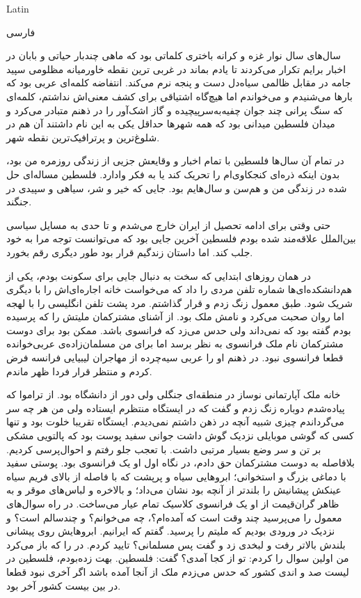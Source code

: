 \documentclass[letterpaper,12pt]{article}
\title{\ptitle}
\author{\pauthor}
\date{\today}
\begin{document}
\maketitle
\begin{latin} 
Latin 
\end{latin} 
\begin{persian} 
فارسی  
\end{persian}
سا‌ل‌های سال نوار غزه و کرانه باختری  کلماتی بود که ماهی چندبار حیاتی و بابان در اخبار برایم تکرار می‌کردند تا یادم بماند در غربی ترین نقطه خاورمیانه مظلومی سپید جامه در مقابل ظالمی سیاه‌دل دست و پنجه نرم‌ می‌کند. انتفاضه کلمه‌ای عربی بود که بارها می‌شنیدم و می‌خواندم اما هیچ‌گاه اشتیاقی برای کشف معنی‌اش نداشتم، کلمه‌ای که سنگ پرانی چند جوان چفیه‌به‌سرپیچیده و گاز اشک‌آور را در ذهنم متبادر می‌کرد و میدان فلسطین میدانی بود که همه شهر‌ها حداقل یکی به این نام داشتند آن هم در شلوغ‌ترین و پرترافیک‌ترین نقطه شهر.

در تمام آن سال‌ها فلسطین با تمام اخبار و وقایعش جزیی از زندگی روزمره من بود، بدون اینکه ذره‌ای کنجکاوی‌ام را تحریک کند یا به فکر وادارد. فلسطین مساله‌ای حل شده در زندگی من و هم‌سن و سال‌هایم بود. جایی که خیر و شر، سیاهی و سپیدی در جنگند.

حتی وقتی برای ادامه تحصیل از ایران خارج‌ می‌شدم و تا حدی به مسایل سیاسی بین‌الملل علاقه‌مند شده بودم فلسطین آخرین جایی بود که می‌توانست توجه مرا به خود جلب کند. اما داستان زندگیم قرار بود طور دیگری رقم بخورد.


در همان روزهای ابتدایی که سخت به دنبال جایی برای سکونت بودم، یکی از هم‌دانشکده‌ای‌ها شماره تلفن مردی را داد که می‌خواست خانه اجاره‌ای‌اش را با دیگری شریک شود. طبق معمول زنگ زدم و قرار گذاشتم. مرد پشت تلفن انگلیسی را با لهجه اما روان صحبت می‌کرد و نامش ملک بود. از آشنای مشترکمان ملیتش را که پرسیده بودم گفته بود که نمی‌داند ولی حدس می‌زد که فرانسوی باشد. ممکن بود برای دوست مشترکمان نام ملک فرانسوی به نظر برسد اما برای من مسلمان‌زاده‌ی عربی‌خوانده قطعا فرانسوی نبود. در ذهنم او را عربی سیه‌چرده از مهاجران لیبیایی فرانسه فرض کردم و منتظر قرار فردا ظهر ماندم.

خانه ملک آپارتمانی نوساز در منطقه‌ای جنگلی ولی دور از دانشگاه بود. از تراموا که پیاده‌شدم دوباره زنگ زدم و گفت که در ایستگاه منتظرم ایستاده ولی من هر چه سر می‌گرداندم چیزی شبیه آنچه در ذهن داشتم نمی‌دیدم. ایستگاه تقریبا خلوت بود و تنها کسی که گوشی موبایلی نزدیک گوش داشت جوانی سفید پوست بود که پالتویی مشکی بر تن و سر وضع بسیار مرتبی داشت. با تعجب جلو رفتم و احوال‌پرسی کردیم. بلافاصله به دوست مشترکمان حق دادم، در نگاه اول او یک فرانسوی بود. پوستی سفید با دماغی بزرگ و استخوانی؛ ابرو‌هایی سیاه و پرپشت که با فاصله از بالای فریم سیاه عینکش پیشانیش را بلندتر از آنچه بود نشان می‌داد؛ و بالاخره و لباس‌های موقر و به ظاهر گران‌قیمت از او یک فرانسوی کلاسیک تمام عیار‌ می‌ساخت. در راه سوال‌های معمول را می‌پرسید چند وقت است که آمده‌ام؟، چه می‌خوانم؟ و چند‌سالم است؟ و نزدیک در ورودی بودیم که ملیتم را پرسید. گفتم که ایرانیم. ابرو‌هایش روی پیشانی‌ بلندش بالاتر رفت و لبخدی زد و گفت پس مسلمانی؟ تایید کردم. در را که باز می‌کرد من اولین سوال را کردم: تو از کجا آمدی؟ گفت: فلسطین. بهت زده‌بودم، فلسطین در لیست صد و اندی کشور که حدس می‌زدم ملک از آنجا آمده باشد اگر آخری نبود قطعا در بین بیست کشور آخر بود.
\end{document}

